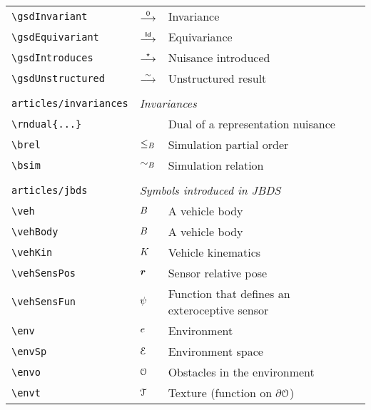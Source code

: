 \begin{longtable}{lll}
 {\color[rgb]{0.5,0.5,0.5}\texttt{\textbackslash gsdInvariant}} & $\stackrel{0}{\longrightarrow}$ &  Invariance\\ 
 {\color[rgb]{0.5,0.5,0.5}\texttt{\textbackslash gsdEquivariant}} & $\stackrel{\mathsf{Id}}{\longrightarrow}$ &  Equivariance\\ 
 {\color[rgb]{0.5,0.5,0.5}\texttt{\textbackslash gsdIntroduces}} & $\stackrel{\star}{\longrightarrow}$ &  Nuisance introduced\\ 
 {\color[rgb]{0.5,0.5,0.5}\texttt{\textbackslash gsdUnstructured}} & $\stackrel{\sim}{\longrightarrow}$ &  Unstructured result\\ 
  &  & \\ 
 {\color[rgb]{0.5,0.5,0.5}\texttt{articles/invariances}} & \multicolumn{2}{l}{\emph{Invariances}}\\ 
 \hline
{\color[rgb]{0.5,0.5,0.5}\texttt{\textbackslash rndual\{...\}}} &  &  Dual of a representation nuisance\\ 
 {\color[rgb]{0.5,0.5,0.5}\texttt{\textbackslash brel}} & $\leq_{B}$ &  Simulation partial order\\ 
 {\color[rgb]{0.5,0.5,0.5}\texttt{\textbackslash bsim}} & $\sim_{B}$ &  Simulation relation\\ 
  &  & \\ 
 {\color[rgb]{0.5,0.5,0.5}\texttt{articles/jbds}} & \multicolumn{2}{l}{\emph{Symbols introduced in JBDS}}\\ 
 \hline
{\color[rgb]{0.5,0.5,0.5}\texttt{\textbackslash veh}} & $B$ &  A vehicle body\\ 
 {\color[rgb]{0.5,0.5,0.5}\texttt{\textbackslash vehBody}} & $B$ &  A vehicle body\\ 
 {\color[rgb]{0.5,0.5,0.5}\texttt{\textbackslash vehKin}} & $K$ &  Vehicle kinematics \\ 
 {\color[rgb]{0.5,0.5,0.5}\texttt{\textbackslash vehSensPos}} & $\boldsymbol{r}$ &  Sensor relative pose\\ 
 {\color[rgb]{0.5,0.5,0.5}\texttt{\textbackslash vehSensFun}} & $\psi$ &  Function that defines an exteroceptive sensor\\ 
 {\color[rgb]{0.5,0.5,0.5}\texttt{\textbackslash env}} & $e$ &  Environment\\ 
 {\color[rgb]{0.5,0.5,0.5}\texttt{\textbackslash envSp}} & $\mathcal{E}$ &  Environment space\\ 
 {\color[rgb]{0.5,0.5,0.5}\texttt{\textbackslash envo}} & $\mathcal{O}$ &  Obstacles in the environment\\ 
 {\color[rgb]{0.5,0.5,0.5}\texttt{\textbackslash envt}} & $\mathcal{T}$ &  Texture (function on $\partial \mathcal{O}$)\\ 

\end{longtable}
